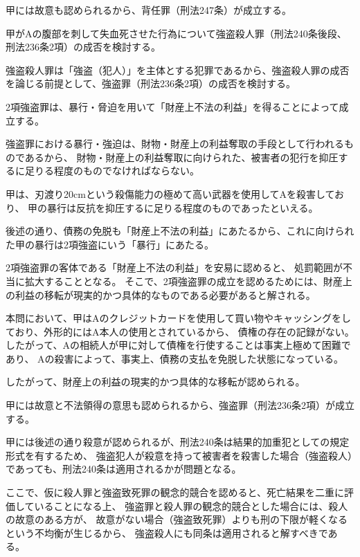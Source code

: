 \documentclass[11pt]{jsarticle}
\begin{document}
	甲には故意も認められるから、背任罪（刑法247条）が成立する。
	
				
	甲がAの腹部を刺して失血死させた行為について強盗殺人罪（刑法240条後段、刑法236条2項）の成否を検討する。

		強盗殺人罪は「強盗（犯人）」を主体とする犯罪であるから、強盗殺人罪の成否を論じる前提として、強盗罪（刑法236条2項）の成否を検討する。
		
		2項強盗罪は、暴行・脅迫を用いて「財産上不法の利益」を得ることによって成立する。
		
		\sectionC{}
			強盗罪における暴行・強迫は、財物・財産上の利益奪取の手段として行われるものであるから、
			財物・財産上の利益奪取に向けられた、被害者の犯行を抑圧するに足りる程度のものでなければならない。
			
			甲は、刃渡り20cmという殺傷能力の極めて高い武器を使用してAを殺害しており、
			甲の暴行は反抗を抑圧するに足りる程度のものであったといえる。
			
			後述の通り、債務の免脱も「財産上不法の利益」にあたるから、これに向けられた甲の暴行は2項強盗にいう「暴行」にあたる。
		
		\sectionC{}
			2項強盗罪の客体である「財産上不法の利益」を安易に認めると、
			処罰範囲が不当に拡大することとなる。
			そこで、2項強盗罪の成立を認めるためには、財産上の利益の移転が現実的かつ具体的なものである必要があると解される。
			
			本問において、甲はAのクレジットカードを使用して買い物やキャッシングをしており、外形的にはA本人の使用とされているから、
			債権の存在の記録がない。したがって、Aの相続人が甲に対して債権を行使することは事実上極めて困難であり、
			Aの殺害によって、事実上、債務の支払を免脱した状態になっている。
			
			したがって、財産上の利益の現実的かつ具体的な移転が認められる。
			
		\sectionC{}
			甲には故意と不法領得の意思も認められるから、強盗罪（刑法236条2項）が成立する。
			
		\sectionC{}
			甲には後述の通り殺意が認められるが、刑法240条は結果的加重犯としての規定形式を有するため、
			強盗犯人が殺意を持って被害者を殺害した場合（強盗殺人）であっても、刑法240条は適用されるかが問題となる。
			
			ここで、仮に殺人罪と強盗致死罪の観念的競合を認めると、死亡結果を二重に評価していることになる上、
			強盗罪と殺人罪の観念的競合とした場合には、殺人の故意のある方が、
			故意がない場合（強盗致死罪）よりも刑の下限が軽くなるという不均衡が生じるから、
			強盗殺人にも同条は適用されると解すべきである。
		
\end{document}
